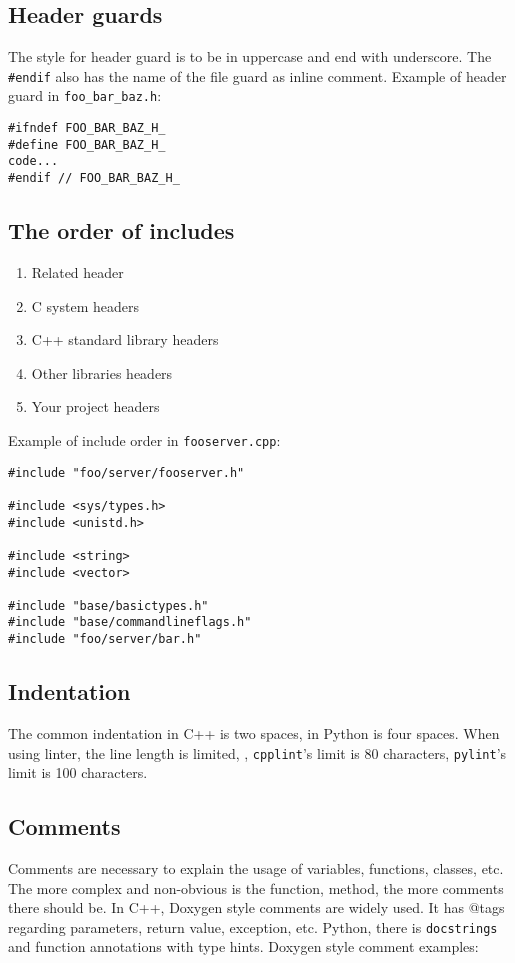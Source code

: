 \subsection{Header guards}

The style for header guard is to be in uppercase and end with underscore. The \texttt{\#endif} also has the name of the file guard as inline comment. Example of header guard in \verb|foo_bar_baz.h|:
\begin{verbatim}
#ifndef FOO_BAR_BAZ_H_
#define FOO_BAR_BAZ_H_
code...
#endif // FOO_BAR_BAZ_H_
\end{verbatim}

\subsection{The order of includes}
\begin{enumerate}
	\setlength\itemsep{0em}
	\item Related header
	\item C system headers
	\item C++ standard library headers
	\item Other libraries headers
	\item Your project headers
\end{enumerate}

Example of include order in \texttt{fooserver.cpp}:
\begin{verbatim}
#include "foo/server/fooserver.h"

#include <sys/types.h>
#include <unistd.h>

#include <string>
#include <vector>

#include "base/basictypes.h"
#include "base/commandlineflags.h"
#include "foo/server/bar.h"
\end{verbatim}

\subsection{Indentation}
The common indentation in C++ is two spaces, in Python is four spaces. When using linter, the line length is limited, \eg, \texttt{cpplint}'s limit is 80 characters, \texttt{pylint}'s limit is 100 characters.

\subsection{Comments}
Comments are necessary to explain the usage of variables, functions, classes, etc. The more complex and non-obvious is the function, method, the more comments there should be. In C++, Doxygen style comments are widely used. It has @tags regarding parameters, return value, exception, etc. Python, there is \verb|docstrings| and function annotations with type hints. Doxygen style comment examples:

